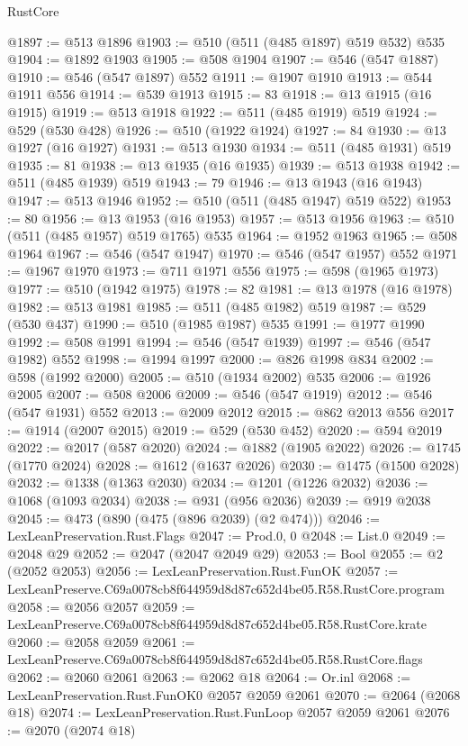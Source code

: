 \begin{lexlean}{RustCore}
\begin{coremodule}
@1897 := @513 @1896
@1903 := @510 (@511 (@485 @1897) @519 @532) @535
@1904 := @1892 @1903
@1905 := @508 @1904
@1907 := @546 (@547 @1887)
@1910 := @546 (@547 @1897) @552
@1911 := @1907 @1910
@1913 := @544 @1911 @556
@1914 := @539 @1913
@1915 := 83
@1918 := @13 @1915 (@16 @1915)
@1919 := @513 @1918
@1922 := @511 (@485 @1919) @519
@1924 := @529 (@530 @428)
@1926 := @510 (@1922 @1924)
@1927 := 84
@1930 := @13 @1927 (@16 @1927)
@1931 := @513 @1930
@1934 := @511 (@485 @1931) @519
@1935 := 81
@1938 := @13 @1935 (@16 @1935)
@1939 := @513 @1938
@1942 := @511 (@485 @1939) @519
@1943 := 79
@1946 := @13 @1943 (@16 @1943)
@1947 := @513 @1946
@1952 := @510 (@511 (@485 @1947) @519 @522)
@1953 := 80
@1956 := @13 @1953 (@16 @1953)
@1957 := @513 @1956
@1963 := @510 (@511 (@485 @1957) @519 @1765) @535
@1964 := @1952 @1963
@1965 := @508 @1964
@1967 := @546 (@547 @1947)
@1970 := @546 (@547 @1957) @552
@1971 := @1967 @1970
@1973 := @711 @1971 @556
@1975 := @598 (@1965 @1973)
@1977 := @510 (@1942 @1975)
@1978 := 82
@1981 := @13 @1978 (@16 @1978)
@1982 := @513 @1981
@1985 := @511 (@485 @1982) @519
@1987 := @529 (@530 @437)
@1990 := @510 (@1985 @1987) @535
@1991 := @1977 @1990
@1992 := @508 @1991
@1994 := @546 (@547 @1939)
@1997 := @546 (@547 @1982) @552
@1998 := @1994 @1997
@2000 := @826 @1998 @834
@2002 := @598 (@1992 @2000)
@2005 := @510 (@1934 @2002) @535
@2006 := @1926 @2005
@2007 := @508 @2006
@2009 := @546 (@547 @1919)
@2012 := @546 (@547 @1931) @552
@2013 := @2009 @2012
@2015 := @862 @2013 @556
@2017 := @1914 (@2007 @2015)
@2019 := @529 (@530 @452)
@2020 := @594 @2019
@2022 := @2017 (@587 @2020)
@2024 := @1882 (@1905 @2022)
@2026 := @1745 (@1770 @2024)
@2028 := @1612 (@1637 @2026)
@2030 := @1475 (@1500 @2028)
@2032 := @1338 (@1363 @2030)
@2034 := @1201 (@1226 @2032)
@2036 := @1068 (@1093 @2034)
@2038 := @931 (@956 @2036)
@2039 := @919 @2038
@2045 := @473 (@890 (@475 (@896 @2039) (@2 @474)))
@2046 := LexLeanPreservation.Rust.Flags
@2047 := Prod.{0, 0}
@2048 := List.{0}
@2049 := @2048 @29
@2052 := @2047 (@2047 @2049 @29)
@2053 := Bool
@2055 := @2 (@2052 @2053)
@2056 := LexLeanPreservation.Rust.FunOK
@2057 := LexLeanPreserve.C69a0078cb8f644959d8d87c652d4be05.R58.RustCore.program
@2058 := @2056 @2057
@2059 := LexLeanPreserve.C69a0078cb8f644959d8d87c652d4be05.R58.RustCore.krate
@2060 := @2058 @2059
@2061 := LexLeanPreserve.C69a0078cb8f644959d8d87c652d4be05.R58.RustCore.flags
@2062 := @2060 @2061
@2063 := @2062 @18
@2064 := Or.inl
@2068 := LexLeanPreservation.Rust.FunOK0 @2057 @2059 @2061
@2070 := @2064 (@2068 @18)
@2074 := LexLeanPreservation.Rust.FunLoop @2057 @2059 @2061
@2076 := @2070 (@2074 @18)

\end{coremodule}
\end{lexlean}
